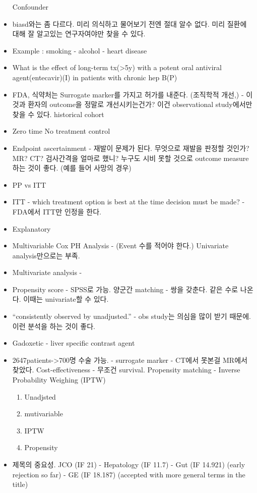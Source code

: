 \documentclass[]{book}
\providecommand{\tightlist}{%
  \setlength{\itemsep}{0pt}\setlength{\parskip}{0pt}}
\begin{document}
\begin{itemize}
  Confounder
\item
  biasd와는 좀 다르다. 미리 의식하고 물어보기 전엔 절대 알수 없다. 미리
  질환에 대해 잘 알고있는 연구자여야만 찾을 수 있다.
\item
  Example : smoking - alcohol - heart disease
\item
  What is the effect of long-term tx(\textgreater{}5y) with a potent
  oral antiviral agent(entecavir)(I) in patients with chronic hep B(P)
\item
  FDA, 식약처는 Surrogate marker를 가지고 허가를 내준다. (조직학적
  개선,) - 이것과 환자의 outcome을 정말로 개선시키는건가? 이건
  observational study에서만 찾을 수 있다. historical cohort
\item
  Zero time No treatment control
\item
  Endpoint ascertainment - 재발이 문제가 된다. 무엇으로 재발을 판정할
  것인가? MR? CT? 검사간격을 얼마로 했니? 누구도 시비 못할 것으로
  outcome measure하는 것이 좋다. (예를 들어 사망의 경우)
\item
  PP vs ITT
\item
  ITT - which treatment option is best at the time decision must be
  made? - FDA에서 ITT만 인정을 한다.
\item
  Explanatory
\item
  Multivariable Cox PH Analysis - (Event 수를 적어야 한다.) Univariate
  analysis만으로는 부족.
\item
  Multivariate analysis -
\item
  Propensity score - SPSS로 가능. 양군간 matching - 쌍을 갖춘다. 같은
  수로 나온다. 이때는 univariate할 수 있다.
\item
  ``consistently observed by unadjusted.'' - obs study는 의심을 많이
  받기 때문에. 이런 분석을 하는 것이 좋다.
\item
  Gadoxetic - liver specific contrast agent
\item
  2647patients-\textgreater{}700명 수술 가능. - surrogate marker -
  CT에서 못본걸 MR에서 찾았다. \textbar{} Cost-effectiveness - 무조건
  survival. Propensity matching - Inverse Probability Weighing (IPTW)

  \begin{enumerate}
  \def\labelenumi{\arabic{enumi}.}
  \tightlist
  \item
    Unadjsted
  \item
    mutivariable
  \item
    IPTW
  \item
    Propensity
  \end{enumerate}
\item
  제목의 중요성. JCO (IF 21) - Hepatology (IF 11.7) - Gut (IF 14.921)
  (early rejection so far) - GE (IF 18.187) (accepted with more general
  terms in the title)
\end{itemize}
\end{document}
